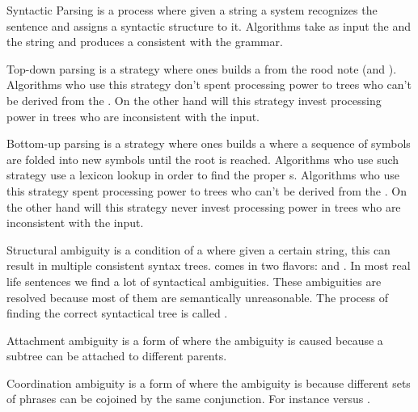 \begin{df}{Syntactic Parsing}
\sb{} is a process where given a string a system recognizes the sentence and assigns a syntactic structure to it. Algorithms take as input the  and the string and produces a  consistent with the grammar.
\end{df}
\begin{df}{Top-down parsing}
\sb{} is a strategy where ones builds a  from the rood note (and ). Algorithms who use this strategy don't spent processing power to trees who can't be derived from the . On the other hand will this strategy invest processing power in trees who are inconsistent with the input.
\end{df}
\begin{df}{Bottom-up parsing}
\sb{} is a strategy where ones builds a  where a sequence of symbols are folded into new symbols until the root is reached. Algorithms who use such strategy use a lexicon lookup in order to find the proper s. Algorithms who use this strategy spent processing power to trees who can't be derived from the . On the other hand will this strategy never invest processing power in trees who are inconsistent with the input.
\end{df}
\begin{df}{Structural ambiguity}
\sb{} is a condition of a  where given a certain string, this can result in multiple consistent syntax trees. \sb{} comes in two flavors:  and . In most real life sentences we find a lot of syntactical ambiguities. These ambiguities are resolved because most of them are semantically unreasonable. The process of finding the correct syntactical tree is called .
\end{df}
\begin{df}{Attachment ambiguity}
\sb{} is a form of  where the ambiguity is caused because a subtree can be attached to different parents.
\end{df}
\begin{df}[Scope]{Coordination ambiguity}
\sb{} is a form of  where the ambiguity is because different sets of phrases can be cojoined by the same conjunction. For instance  versus .
\end{df}
